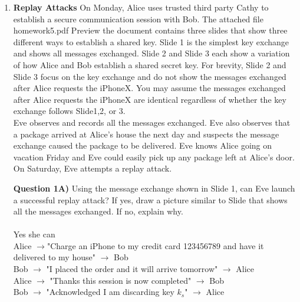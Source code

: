 \documentclass[12pt]{article}
\begin{document}
\renewcommand{\headrulewidth}{0.4pt}

\vspace{-3mm}

\begin{enumerate}

	\item {\textbf{Replay Attacks} On Monday, Alice uses trusted third party Cathy to establish a secure communication session with Bob. The attached file homework5.pdf Preview the document contains three slides that show three different ways to establish a shared key. Slide 1 is the simplest key exchange and shows all messages exchanged.  Slide 2 and Slide 3 each show a variation of how Alice and Bob establish a shared secret key.  For brevity, Slide 2 and Slide 3 focus on the key exchange and do not show the messages exchanged after Alice requests the iPhoneX.  You may assume the messages exchanged after Alice requests the iPhoneX are identical regardless of whether the key exchange follows Slide1,2, or 3. \\

Eve observes and records all the messages exchanged.  Eve also observes that a package arrived at Alice's house the next day and suspects the message exchange caused the package to be delivered.  Eve knows Alice going on vacation Friday and Eve could easily pick up any package left at Alice's door.  On Saturday, Eve attempts a replay attack.}
	
	
	\textbf{Question 1A) }Using the message exchange shown in Slide 1, can Eve launch a successful replay attack? If yes, draw a picture similar to Slide that shows all the messages exchanged. If no, explain why.\\\\ Yes she can \\ 
	Alice $\rightarrow$"Charge an iPhone to my credit card 123456789 and have it delivered to my house" $\rightarrow$ Bob\\
	Bob $\rightarrow$ "I placed the order and it will arrive tomorrow" $\rightarrow$ Alice\\
	Alice $\rightarrow$ "Thanks this session is now completed" $\rightarrow$ Bob \\
	Bob $\rightarrow$  "Acknowledged I am discarding key $k_s$" $\rightarrow$ Alice\\
	

\end{enumerate}
\end{document}
